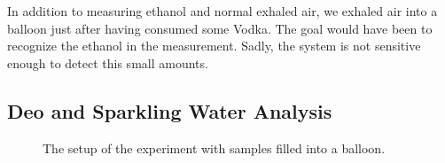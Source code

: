     
    In addition to measuring ethanol and normal exhaled air, we exhaled air into a balloon just after having consumed some Vodka. The goal would have been to recognize the ethanol in the measurement. Sadly, the system is not sensitive enough to detect this small amounts.
    
    
    \newpage
    \subsection{Deo and Sparkling Water Analysis}
    
    \begin{figure}[h]
            \centering
            \quad
            \quad
            \caption{The setup of the experiment with samples filled into a balloon.}
            \label{fig:setup2}
    \end{figure}